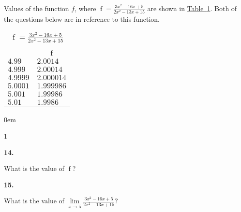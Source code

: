 \documentclass[12pt,]{book}
\theoremstyle{plain}
\theoremstyle{definition}
\numberwithin{equation}{section}
\newcommand{\hrulemedium}{\noalign{\hrule height 0.07em}}
\newcommand{\hrulethick} {\noalign{\hrule height 0.11em}}
\newenvironment{exercisegroup}%
{\medskip\noindent}%
{\par\bigskip}%
\newlength{\exercisegroupindent}%
\newlength{\exercisegroupitemwidth}%
\newenvironment{exercisegrouplist}%
{\vspace{-\partopsep}%
\begin{adjustwidth}{\exercisegroupindent}{0em}}%
{\end{adjustwidth}%
\vspace{-\partopsep}%
\vspace{\baselineskip}}%
\newenvironment{exercisegroupbycol}[1]%
{\begin{exercisegrouplist}%
\vspace{-\multicolsep}%
\begin{multicols}{#1}%
\setlength{\parindent}{0em}%
\setlength{\exercisegroupitemwidth}{\linewidth}}%
{\end{multicols}%
\vspace{-\multicolsep}%
\end{exercisegrouplist}}%
\newenvironment{exercisegroupitem}[1]%
{\begin{minipage}[t]{\exercisegroupitemwidth}
\vspace{0pt}%
{\bfseries#1}%
\rule{0pt}{\baselineskip}}{\strut%
\end{minipage}%
\hspace{\columnsep}}%
\providecommand\phantomsection{}
\newcommand{\fe}[2]{\mathop{{#1}{\left(#2\right)}}}
\begin{document}
\begin{exercisegroup}%
Values of the function \(f\), where \(\fe{f}{x}=\frac{3x^2-16x+5}{2x^2-13x+15}\) are shown in \hyperref[table-rational-function-values]{Table~\ref*{table-rational-function-values}}. Both of the questions below are in reference to this function.%
\begin{table}
\centering
\caption{\(\fe{f}{x}=\frac{3x^2-16x+5}{2x^2-13x+15}\)\label{table-rational-function-values}}
\begin{tabular}{ll}\hrulethick
\multicolumn{1}{c}{\(x\)}&\multicolumn{1}{c}{\(\fe{f}{x}\)}\\\hrulemedium
\(4.99\)&\(2.0014\)\\
\(4.999\)&\(2.00014\)\\
\(4.9999\)&\(2.000014\)\\
\(5.0001\)&\(1.999986\)\\
\(5.001\)&\(1.99986\)\\
\(5.01\)&\(1.9986\)
\end{tabular}
\end{table}
\begin{exercisegroupbycol}{1}%
\begin{exercisegroupitem}{14. }\phantomsection\hypertarget{exercise-43}{\null}
What is the value of \(\fe{f}{5}\)?%
\end{exercisegroupitem}%
\par%
\begin{exercisegroupitem}{15. }\phantomsection\hypertarget{exercise-44}{\null}
What is the value of \(\lim\limits_{x\to5}\frac{3x^2-16x+5}{2x^2-13x+15}\)?%
\end{exercisegroupitem}%
\par%
\end{exercisegroupbycol}%
\end{exercisegroup}%
\end{document}
